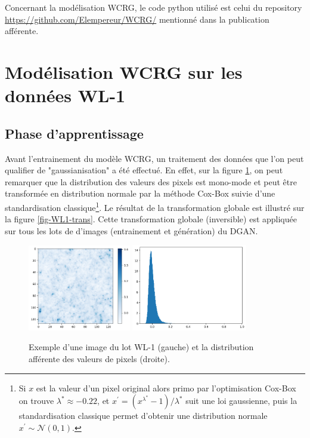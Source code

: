 \documentclass[12pt,twoside]{article}
\begin{document}
Concernant la modélisation WCRG, le code python utilisé est celui du repository \url{https://github.com/Elempereur/WCRG/} mentionné dans la publication afférente.
%
\section{Modélisation WCRG sur les données WL-1}
%
\subsection{Phase d'apprentissage}
%
Avant l'entrainement du modèle WCRG, un traitement des données que l'on peut qualifier de "gaussianisation" a été effectué. En effet, sur la figure \ref{fig-WL1-non-trans}, on peut remarquer que la distribution des valeurs des pixels est mono-mode et peut être transformée en distribution normale par la méthode Cox-Box suivie d'une standardisation classique\footnote{Si $x$ est la valeur d'un pixel original alors primo par l'optimisation Cox-Box on trouve $\lambda^\ast \approx -0.22$, et $x^\prime = (x^{\lambda^\ast}-1)/\lambda^\ast$ suit une loi gaussienne, puis la standardisation classique permet d'obtenir une distribution normale $x^\prime \sim \mathcal{N}(0,1)$.}. Le résultat de la transformation globale est illustré sur la figure \ref{fig-WL1-trans}. Cette transformation globale (inversible) est appliquée sur tous les lots de d'images (entrainement et génération) du DGAN.
%
\begin{figure}[h]
\centering
\includegraphics[width=0.4\textwidth]{fig-WL1-img-non-transformed.png}
\includegraphics[width=0.45\textwidth]{fig-WL1-pixelval-non-trans.png}
\caption{Exemple d'une image du lot WL-1 (gauche) et la distribution afférente des valeurs de pixels (droite).}
\label{fig-WL1-non-trans}
\end{figure}
\end{document}
